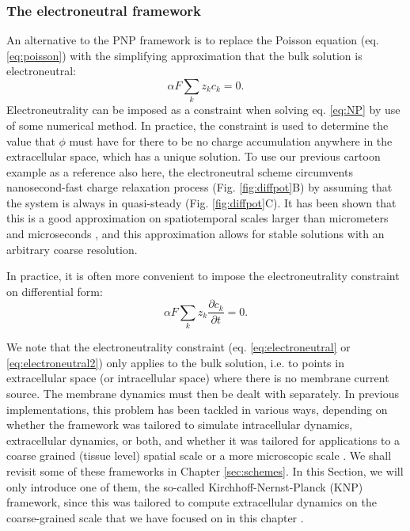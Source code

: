 \subsubsection{The electroneutral framework}
An alternative to the PNP framework is to replace the Poisson equation (eq. \ref{eq:poisson}) with the simplifying approximation that the bulk solution is electroneutral:
\begin{equation}
\alpha F \sum_k z_k c_k = 0.
\label{eq:electroneutral}
\end{equation}
Electroneutrality can be imposed as a constraint when solving eq. \ref{eq:NP} by use of some numerical method. In practice, the constraint is used to determine the value that $\phi$ must have for there to be no charge accumulation anywhere in the extracellular space, which has a unique solution. To use our previous cartoon example as a reference also here, the electroneutral scheme circumvents nanosecond-fast charge relaxation process (Fig. \ref{fig:diffpot}B) by assuming that the system is always in quasi-steady (Fig. \ref{fig:diffpot}C). It has been shown that this is a good approximation on spatiotemporal scales larger than micrometers and microseconds \citep{Grodzinsky2011, Pods2017, Solbra2018}, and this approximation allows for stable solutions with an arbitrary coarse resolution.

In practice, it is often more convenient to impose the electroneutrality constraint on differential form:
\begin{equation}
\alpha F \sum_k{z_k \frac{\partial c_k}{\partial t}} = 0.
\label{eq:electroneutral2}
\end{equation}

We note that the electroneutrality constraint (eq. \ref{eq:electroneutral} or \ref{eq:electroneutral2}) only applies to the bulk solution, i.e. to points in extracellular space (or intracellular space) where there is no membrane current source. The membrane dynamics must then be dealt with separately. In previous implementations, this problem has been tackled in various ways, depending on whether the framework was tailored to simulate intracellular dynamics, extracellular dynamics, or both, and whether it was tailored for applications to a coarse grained (tissue level) spatial scale or a more microscopic scale \citep{Mori2008, Mori2009, Mori2009a, Mori2011, Halnes2015, Halnes2013, Pods2017, Niederer2013, OConnell2016, Solbra2018, tuttle2019, ellingsrud2019}. We shall revisit some of these frameworks in Chapter \ref{sec:schemes}. In this Section, we will only introduce one of them, the so-called Kirchhoff-Nernst-Planck (KNP) framework, since this was tailored to compute extracellular dynamics on the coarse-grained scale that we have focused on in this chapter \citep{Solbra2018}.


